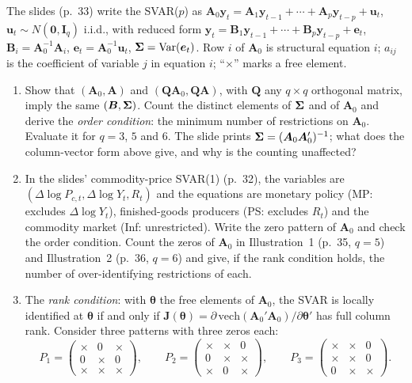 \documentclass[11pt,a4paper]{article}
\begin{document}
The slides (p.~33) write the SVAR($p$) as $\bm A_0\bm y_t=\bm A_1\bm y_{t-1}+\cdots+\bm A_p\bm y_{t-p}+\bm u_t$,
$\bm u_t\sim N(\bm0,\bm I_q)$ i.i.d., with reduced form $\bm y_t=\bm B_1\bm y_{t-1}+\cdots+\bm B_p\bm y_{t-p}+\bm e_t$,
$\bm B_i=\bm A_0^{-1}\bm A_i$, $\bm e_t=\bm A_0^{-1}\bm u_t$, $\bm{\Sigma}=\mathrm{Var}(\bm e_t)$. Row $i$ of $\bm A_0$ is structural
equation $i$; $a_{ij}$ is the coefficient of variable $j$ in equation $i$; ``$\times$'' marks a free element.
\begin{enumerate}[label=(\alph*),leftmargin=2em]
\item Show that $(\bm A_0,\bm A)$ and $(\bm Q\bm A_0,\bm Q\bm A)$, with $\bm Q$ any $q\times q$ orthogonal matrix, imply the same
$(\bm B,\bm{\Sigma})$. Count the distinct elements of $\bm{\Sigma}$ and of $\bm A_0$ and derive the \emph{order condition}: the minimum
number of restrictions on $\bm A_0$. Evaluate it for $q=3$, $5$ and $6$. The slide prints $\bm{\Sigma}=(\bm A_0\bm A_0')^{-1}$;
what does the column-vector form above give, and why is the counting unaffected?
\item In the slides' commodity-price SVAR(1) (p.~32), the variables are $(\Delta\log P_{c,t},\Delta\log Y_t,R_t)$ and the
equations are monetary policy (MP: excludes $\Delta\log Y_t$), finished-goods producers (PS: excludes $R_t$) and the
commodity market (Inf: unrestricted). Write the zero pattern of $\bm A_0$ and check the order condition. Count the zeros
of $\bm A_0$ in Illustration~1 (p.~35, $q=5$) and Illustration~2 (p.~36, $q=6$) and give, if the rank condition holds,
the number of over-identifying restrictions of each.
\item The \emph{rank condition}: with $\bm\theta$ the free elements of $\bm A_0$, the SVAR is locally identified at $\bm\theta$ if
and only if $\bm J(\bm\theta)=\partial\,\mathrm{vech}(\bm A_0'\bm A_0)/\partial\bm\theta'$ has full column rank. Consider
three patterns with three zeros each:
\[
P_1=\begin{pmatrix}\times&0&\times\\0&\times&0\\\times&\times&\times\end{pmatrix},\qquad
P_2=\begin{pmatrix}\times&\times&0\\0&\times&\times\\\times&0&\times\end{pmatrix},\qquad
P_3=\begin{pmatrix}\times&\times&0\\\times&\times&0\\0&\times&\times\end{pmatrix}.
\]
\end{enumerate}
\end{document}
